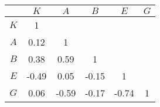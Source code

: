 \begin{tabular}{c  c  c  c  c  c}\hline \hline
     &  $K$      &     $A$   &      $B$   &      $E$  & $G$ \\ \hline
 $K$ &     1     &           &            &           &   \\ 
 $A$ & 0.12 &      1    &            &           &   \\ 
 $B$ & 0.38 & 0.59 &      1     &           &   \\ 
 $E$ & -0.49 & 0.05 & -0.15 &      1    &   \\ 
 $G$ & 0.06 & -0.59 & -0.17 & -0.74 & 1 \\ \hline \hline
\end{tabular}
